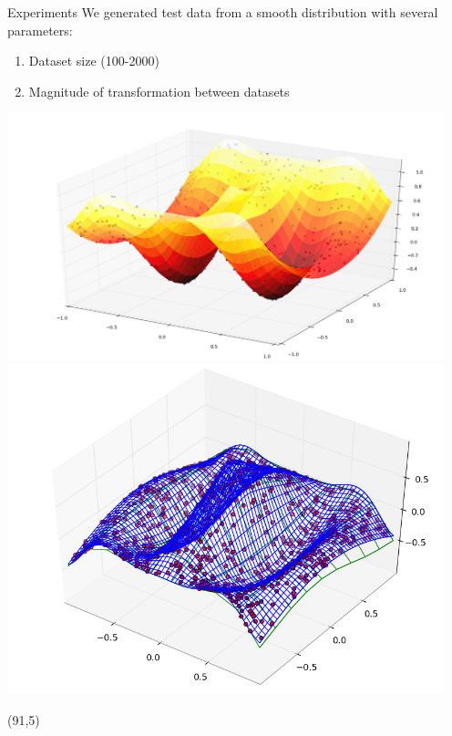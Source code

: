 \documentclass[final]{beamer}
\begin{document}
\begin{frame}{}
\begin{textblock}{27}
\begin{block}{Experiments}
We generated test data from a smooth distribution with several parameters:
\begin{enumerate}
\item Dataset size (100-2000)
\item Magnitude of transformation between datasets
\end{enumerate}
\includegraphics[width=5in]{DistributionPlusPoints.png}
\includegraphics[width=5in]{Reconstruction.png}
\end{block}

\end{textblock}


\begin{textblock}{27}(91,5)


\end{textblock}
\end{frame}
\end{document}
